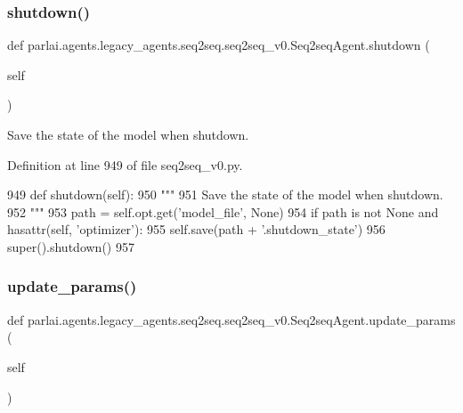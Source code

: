 \subsubsection{\texorpdfstring{shutdown()}{shutdown()}}
{\footnotesize\ttfamily def parlai.\+agents.\+legacy\+\_\+agents.\+seq2seq.\+seq2seq\+\_\+v0.\+Seq2seq\+Agent.\+shutdown (\begin{DoxyParamCaption}\item[{}]{self }\end{DoxyParamCaption})}

\begin{DoxyVerb}Save the state of the model when shutdown.
\end{DoxyVerb}
 

Definition at line 949 of file seq2seq\+\_\+v0.\+py.


\begin{DoxyCode}
949     \textcolor{keyword}{def }shutdown(self):
950         \textcolor{stringliteral}{"""}
951 \textcolor{stringliteral}{        Save the state of the model when shutdown.}
952 \textcolor{stringliteral}{        """}
953         path = self.opt.get(\textcolor{stringliteral}{'model\_file'}, \textcolor{keywordtype}{None})
954         \textcolor{keywordflow}{if} path \textcolor{keywordflow}{is} \textcolor{keywordflow}{not} \textcolor{keywordtype}{None} \textcolor{keywordflow}{and} hasattr(self, \textcolor{stringliteral}{'optimizer'}):
955             self.save(path + \textcolor{stringliteral}{'.shutdown\_state'})
956         super().shutdown()
957 
\end{DoxyCode}
\mbox{\label{classparlai_1_1agents_1_1legacy__agents_1_1seq2seq_1_1seq2seq__v0_1_1Seq2seqAgent_a3933d4fdc5e603b1a168d92e7da77151}} 
\subsubsection{\texorpdfstring{update\+\_\+params()}{update\_params()}}
{\footnotesize\ttfamily def parlai.\+agents.\+legacy\+\_\+agents.\+seq2seq.\+seq2seq\+\_\+v0.\+Seq2seq\+Agent.\+update\+\_\+params (\begin{DoxyParamCaption}\item[{}]{self }\end{DoxyParamCaption})}

